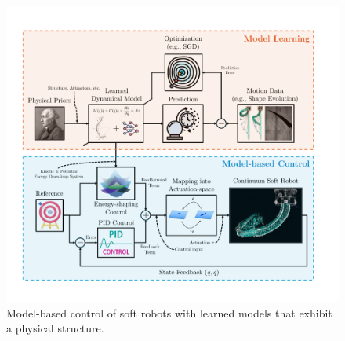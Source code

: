\begin{figure}
    \centering
    \includegraphics[width=1.0\linewidth]{introduction/figures/model_based_control_with_learned_models_v1_cropped.pdf}
    \caption{Model-based control of soft robots with learned models that exhibit a physical structure.}
    \label{fig:introduction:model_based_control_with_learned_models}
\end{figure}

